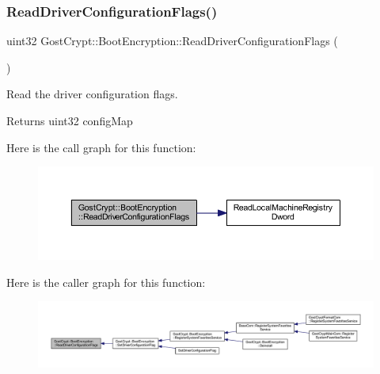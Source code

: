 \subsubsection{\texorpdfstring{Read\+Driver\+Configuration\+Flags()}{ReadDriverConfigurationFlags()}}
{\footnotesize\ttfamily uint32 Gost\+Crypt\+::\+Boot\+Encryption\+::\+Read\+Driver\+Configuration\+Flags (\begin{DoxyParamCaption}{ }\end{DoxyParamCaption})}



Read the driver configuration flags. 

\begin{DoxyReturn}{Returns}
uint32 config\+Map 
\end{DoxyReturn}
Here is the call graph for this function\+:
\nopagebreak
\begin{figure}[H]
\begin{center}
\leavevmode
\includegraphics[width=350pt]{class_gost_crypt_1_1_boot_encryption_a948419f4d72d1da1943632761b47de08_cgraph}
\end{center}
\end{figure}
Here is the caller graph for this function\+:
\nopagebreak
\begin{figure}[H]
\begin{center}
\leavevmode
\includegraphics[width=350pt]{class_gost_crypt_1_1_boot_encryption_a948419f4d72d1da1943632761b47de08_icgraph}
\end{center}
\end{figure}
\mbox{\label{class_gost_crypt_1_1_boot_encryption_ab800499c17495d75aecfd93cd0942690}} 
